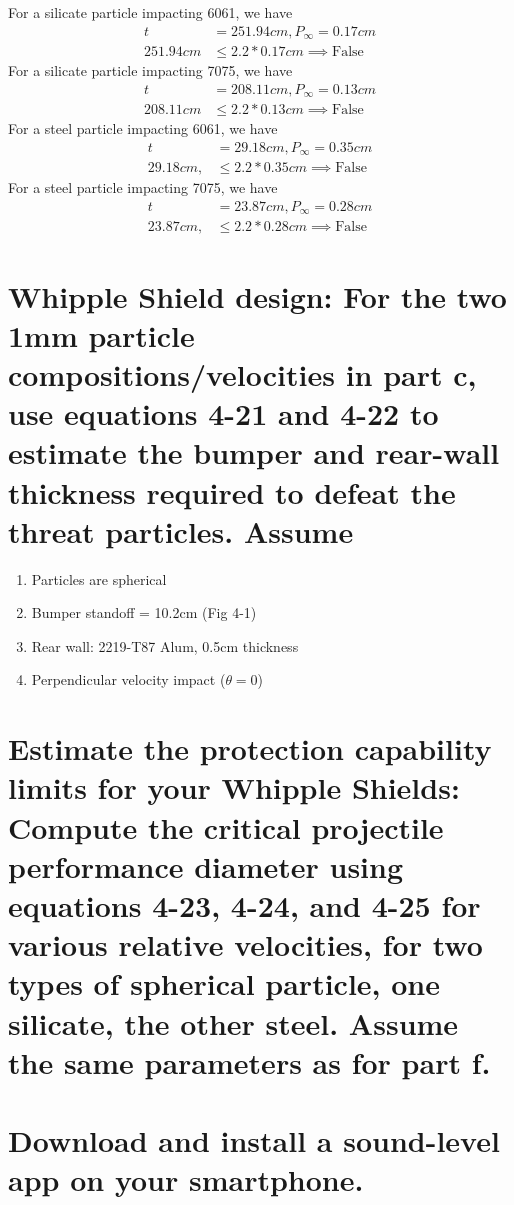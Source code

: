 \documentclass[onecolumn,10pt]{jhwhw}
\begin{document}
\noindent For a silicate particle impacting 6061, we have
\begin{align*}
t &= 251.94 cm, P_{\infty} = 0.17 cm \\
251.94 cm & \leq 2.2 * 0.17 cm \implies \mbox{False}
\end{align*}
\noindent For a silicate particle impacting 7075, we have
\begin{align*}
t &= 208.11 cm, P_{\infty} = 0.13 cm \\
208.11 cm & \leq 2.2 * 0.13 cm \implies \mbox{False}
\end{align*}
\noindent For a steel particle impacting 6061, we have
\begin{align*}
t &= 29.18 cm, P_{\infty} = 0.35 cm \\
29.18 cm, & \leq 2.2 *0.35 cm  \implies \mbox{False}
\end{align*}
\noindent For a steel particle impacting 7075, we have
\begin{align*}
t &= 23.87 cm, P_{\infty} = 0.28 cm \\
23.87 cm, & \leq 2.2 *0.28 cm  \implies \mbox{False}
\end{align*}

\part{Whipple Shield design: For the two 1mm particle compositions/velocities in part c, use equations 4-21 and 4-22 to estimate the bumper and rear-wall thickness required to defeat the threat particles. Assume}
\begin{enumerate}
\item Particles are spherical
\item Bumper standoff = 10.2cm (Fig 4-1)
\item Rear wall: 2219-T87 Alum, 0.5cm thickness
\item Perpendicular velocity impact ($\theta=0$)
\end{enumerate}
\part{Estimate the protection capability limits for your Whipple Shields: Compute the critical projectile performance diameter using equations 4-23, 4-24, and 4-25 for various relative velocities, for two types of spherical particle, one silicate, the other steel. Assume the same parameters as for part f.}

\part{Download and install a sound-level app on your smartphone.}
\end{document}
